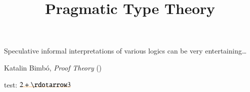 \documentclass{article}
\begin{document}
\title{Pragmatic Type Theory}
\maketitle
\tableofcontents

\vfill
\large

\epigraph{Speculative informal interpretations of various logics can be very entertaining\ldots}
         {Katalin Bimbó, \textit{Proof Theory} (\parencite{bimbo2014proof})}

test:  \(\drawbaseline{2 + \rdotarrow 3}\)




































\appendix
{}
\makeatletter
{}
\label{appendices}
\makeatother













\end{document}
